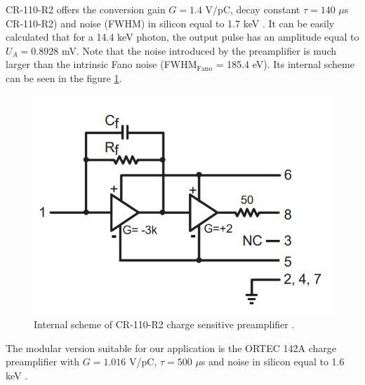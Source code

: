 CR-110-R2 offers the conversion gain $G = 1.4$ V/pC, decay constant $\tau = 140$ $\mu$s CR-110-R2) and noise (FWHM) in silicon equal to 1.7 keV \cite{cr110}. It can be easily calculated that for a 14.4 keV photon, the output pulse has an amplitude equal to $U_{A} = 0.8928$ mV. Note that the noise introduced by the preamplifier is much larger than the intrinsic Fano noise (FWHM$_{\textrm{Fano}}$ = 185.4 eV).  Its internal scheme can be seen in the figure \ref{internal}.   

\begin{figure}[H]
 \centering
 \includegraphics[scale=0.35, angle = 0]{./pictures/CRpreamp.png}
 \caption{Internal scheme of CR-110-R2 charge sensitive preamplifier \cite{cr110}.}
 \label{internal}
 
\end{figure}
\par
The modular version suitable for our application is the ORTEC 142A charge preamplifier with $G = 1.016$ V/pC, $\tau = 500$ $\mu$s and noise in silicon equal to 1.6 keV \cite{ORTECpreamp}.

